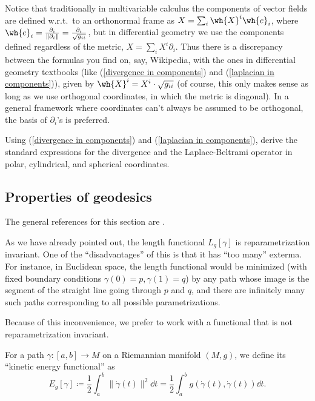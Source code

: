 \begin{rem}
    Notice that traditionally in multivariable calculus the components of vector fields are defined w.r.t.\ to an orthonormal frame as $X=\sum_i \wh{X}^i \wh{e}_i$, where $\wh{e}_i=\frac{\partial_i}{\lVert \partial_i\lVert}=\frac{\partial_i}{\sqrt{g_{ii}}}$, but in differential geometry we use the components defined regardless of the metric, $X=\sum_i X^i \partial_i$. Thus there is a discrepancy between the formulas you find on, say, Wikipedia, with the ones in differential geometry textbooks (like (\ref{divergence in components}) and (\ref{laplacian in components})), given by $\wh{X}^i=X^i\cdot \sqrt{g_{ii}}$ (of course, this only makes sense as long as we use orthogonal coordinates, in which the metric is diagonal). In a general framework where coordinates can't always be assumed to be orthogonal, the basis of $\partial_i$'s is preferred.
\end{rem}

\begin{xca}
    Using (\ref{divergence in components}) and (\ref{laplacian in components}), derive the standard expressions for the divergence and the Laplace-Beltrami operator in polar, cylindrical, and spherical  coordinates. 
\end{xca}




\subsection{Properties of geodesics}


The general references for this section are \cite{Jost,Milnor}.

As we have already pointed out, the length functional $L_g[\gamma]$ is reparametrization invariant. One of the ``disadvantages'' of this is that it has ``too many'' exterma. For instance, in Euclidean space, the length functional would be minimized (with fixed boundary conditions $\gamma(0)=p,\gamma(1)=q$) by any path whose image is the segment of the straight line going through $p$ and $q$, and there are infinitely many such paths corresponding to all possible parametrizations.

Because of this inconvenience, we prefer to work with a functional that is not reparametrization invariant.

\begin{defn}
    For a path $\gamma:[a,b]\to M$ on a Riemannian manifold $(M,g)$, we define its ``kinetic energy functional'' as
    \[E_g[\gamma]\coloneqq \frac12 \int_a^b \lVert \dot\gamma(t)\rVert^2\dd t=\frac12 \int_a^b g(\dot\gamma(t),\dot\gamma(t))\dd t.\]
\end{defn}

